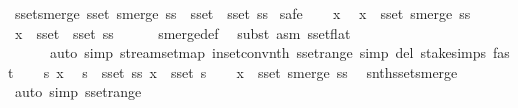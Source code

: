 \begin{isabellebody}
{\isafoldproof}%
%
\isadelimproof
\isanewline
%
\endisadelimproof
\isanewline
{}\isamarkupfalse%
\ sset{\isacharunderscore}smerge{\isacharcolon}\ {\isachardoublequoteopen}sset\ {\isacharparenleft}smerge\ ss{\isacharparenright}\ {\isacharequal}\ {\isasymUnion}{\isacharparenleft}sset\ {\isacharbackquote}\ {\isacharparenleft}sset\ ss{\isacharparenright}{\isacharparenright}{\isachardoublequoteclose}\isanewline
%
\isadelimproof
%
\endisadelimproof
%
\isatagproof
{}\isamarkupfalse%
\ safe\isanewline
\ \ \isamarkupfalse%
\ x\ \isamarkupfalse%
\ {\isachardoublequoteopen}x\ {\isasymin}\ sset\ {\isacharparenleft}smerge\ ss{\isacharparenright}{\isachardoublequoteclose}\isanewline
\ \ \isamarkupfalse%
\ {\isachardoublequoteopen}x\ {\isasymin}\ {\isasymUnion}{\isacharparenleft}sset\ {\isacharbackquote}\ {\isacharparenleft}sset\ ss{\isacharparenright}{\isacharparenright}{\isachardoublequoteclose}\isanewline
\ \ \ \ \isamarkupfalse%
\ smerge{\isacharunderscore}def\ \isamarkupfalse%
\ {\isacharparenleft}subst\ {\isacharparenleft}asm{\isacharparenright}\ sset{\isacharunderscore}flat{\isacharparenright}\isanewline
\ \ \ \ \ \ {\isacharparenleft}auto\ simp{\isacharcolon}\ stream{\isachardot}set{\isacharunderscore}map\ in{\isacharunderscore}set{\isacharunderscore}conv{\isacharunderscore}nth\ sset{\isacharunderscore}range\ simp\ del{\isacharcolon}\ stake{\isachardot}simps{\isacharcomma}\ fast{\isacharplus}{\isacharparenright}\isanewline
{}\isamarkupfalse%
\isanewline
\ \ \isamarkupfalse%
\ s\ x\ \isamarkupfalse%
\ {\isachardoublequoteopen}s\ {\isasymin}\ sset\ ss{\isachardoublequoteclose}\ {\isachardoublequoteopen}x\ {\isasymin}\ sset\ s{\isachardoublequoteclose}\isanewline
\ \ \isamarkupfalse%
\ {\isachardoublequoteopen}x\ {\isasymin}\ sset\ {\isacharparenleft}smerge\ ss{\isacharparenright}{\isachardoublequoteclose}\ \isamarkupfalse%
\ snth{\isacharunderscore}sset{\isacharunderscore}smerge\ \isamarkupfalse%
\ {\isacharparenleft}auto\ simp{\isacharcolon}\ sset{\isacharunderscore}range{\isacharparenright}\isanewline
{}\isamarkupfalse%
%
\endisatagproof
{\isafoldproof}%
%
\isadelimproof
%
\endisadelimproof
%
\isadelimdocument
%
\endisadelimdocument
%
\isatagdocument
%
\isamarkuptrue%
%
\endisatagdocument
{\isafolddocument}%
%
\isadelimdocument
%
\endisadelimdocument
{}\isamarkupfalse%

\end{isabellebody}
